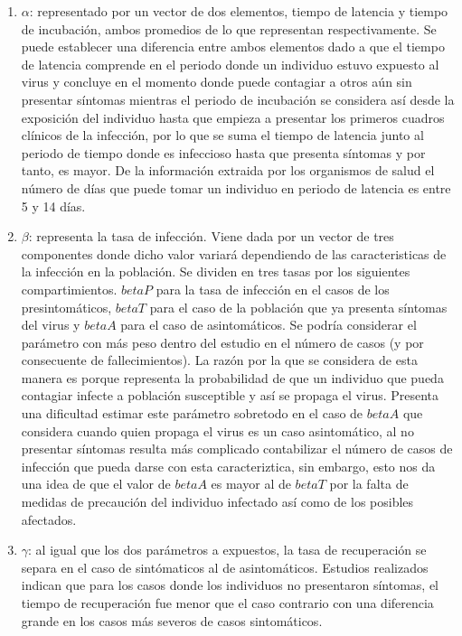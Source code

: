 \documentclass[11pt]{article}
\begin{document}
\begin{enumerate}
	\item[\textperiodcentered] \textbf {$\alpha$}: representado por un vector de dos elementos, tiempo de latencia y tiempo de incubación, ambos promedios de lo que representan respectivamente. Se puede establecer una diferencia entre ambos elementos dado a que el tiempo de latencia comprende en el periodo donde un individuo estuvo expuesto al virus y concluye en el momento donde puede contagiar a otros aún sin presentar síntomas mientras el periodo de incubación se considera así desde la exposición del individuo hasta que empieza a presentar los primeros cuadros clínicos de la infección, por lo que se suma el tiempo de latencia junto al periodo de tiempo donde es infeccioso hasta que presenta síntomas y por tanto, es mayor. De la información extraida por los organismos de salud el número de días que puede tomar un individuo en periodo de latencia es entre 5 y 14 días.
	
	
	\item[\textperiodcentered] \textbf {$\beta$}: representa la tasa de infección. Viene dada por un vector de tres componentes donde dicho valor variará dependiendo de las caracteristicas de la infección en la población. Se dividen en tres tasas por los siguientes compartimientos. $betaP$ para la tasa de infección en el casos de los presintomáticos, $betaT$ para el caso de la población que ya presenta síntomas del virus y $betaA$ para el caso de asintomáticos. Se podría considerar el parámetro con más peso dentro del estudio en el número de casos (y por consecuente de fallecimientos). La razón por la que se considera de esta manera es porque representa la probabilidad de que un individuo que pueda contagiar infecte a población susceptible y así se propaga el virus. Presenta una dificultad estimar este parámetro sobretodo en el caso de $betaA$ que considera cuando quien propaga el virus es un caso asintomático, al no presentar síntomas resulta más complicado contabilizar el número de casos de infección que pueda darse con esta caracteriztica, sin embargo, esto nos da una idea de que el valor de $betaA$ es mayor al de $betaT$ por la falta de medidas de precaución del individuo infectado así como de los posibles afectados.
	

	\item[\textperiodcentered] \textbf {$\gamma$}: al igual que los dos parámetros a expuestos, la tasa de recuperación se separa en el caso de sintómaticos al de asintomáticos. Estudios realizados indican que para los casos donde los individuos no presentaron síntomas, el tiempo de recuperación fue menor que el caso contrario con una diferencia grande en los casos más severos de casos sintomáticos.
	

\end{enumerate}
\end{document}
